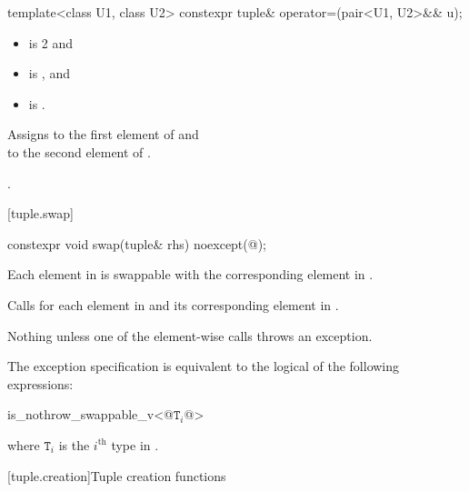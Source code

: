 %
%
\begin{itemdecl}
template<class U1, class U2> constexpr tuple& operator=(pair<U1, U2>&& u);
\end{itemdecl}

\begin{itemdescr}
\pnum
\constraints
\begin{itemize}
\item {} is 2 and
\item {} is , and
\item {} is .
\end{itemize}

\pnum
\effects
Assigns  to the first
element of  and\\  to the
second element of .

\pnum
\returns
{}.
\end{itemdescr}

[tuple.swap]{}

%
\begin{itemdecl}
constexpr void swap(tuple& rhs) noexcept(@\seebelow@);
\end{itemdecl}

\begin{itemdescr}
\pnum
\expects
Each element in  is swappable with
the corresponding element in .

\pnum
\effects
Calls  for each element in  and its
corresponding element in .

\pnum
\throws
Nothing unless one of the element-wise  calls throws an exception.

\pnum
\remarks
The exception specification is equivalent to the logical
 of the following expressions:

\begin{codeblock}
is_nothrow_swappable_v<@$\mathtt{T}_i$@>
\end{codeblock}
where $\mathtt{T}_i$ is the $i^\text{th}$ type in .
\end{itemdescr}

[tuple.creation]{Tuple creation functions}


